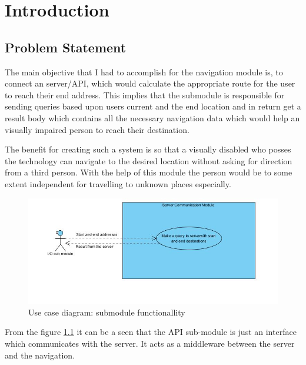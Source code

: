 \newpage
\chapter{Introduction}
	\section{Problem Statement}
		The main objective that I had to accomplish for the navigation module is, to connect an 
		server/API, which would calculate the appropriate route for the user to reach their end address. 
		This implies that the submodule is responsible for sending queries based upon users 
		current and the end location and in return get a result body which contains
		all the necessary navigation data which would help an visually impaired person to reach their 
		destination.
		
		\par
			The benefit for creating such a system is so that a visually disabled who posses
			the technology can navigate to the desired location without asking for direction
			from a third person. With the help of this module the person would be
			to some extent independent for travelling to unknown places especially. 
	
		\begin{figure}[htbp!]
			\centering \includegraphics[scale=0.65]{grafiken/googleServerCommunication.jpg}
			\caption{Use case diagram: submodule functionallity}
			\label{fig:Google API communication}
		\end{figure}

	\par
		From the figure \ref{fig:Google API communication} it can be a seen that the API sub-module is 
		just an interface which communicates with the server. It acts as a 
		middleware between the server and the navigation.

